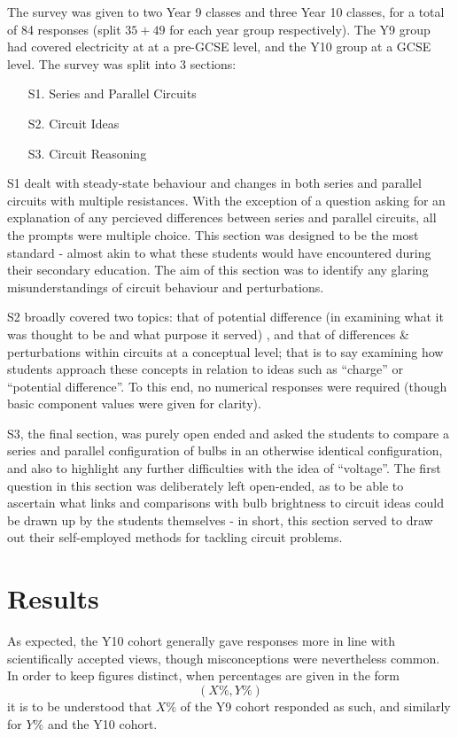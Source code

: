 \documentclass[a4paper,openany,nobib]{tufte-book}
\begin{document}
The survey was given to two Year 9 classes and three Year 10 classes, for a total of 84 responses (split $35+49$ for each year group respectively). The Y9 group had covered electricity at at a pre-GCSE level, and the Y10 group at a GCSE level. The survey was split into 3 sections:
\begin{itemize}
	\item[S1.] Series and Parallel Circuits
	\item[S2.] Circuit Ideas
	\item[S3.] Circuit Reasoning
\end{itemize}
S1 dealt with steady-state behaviour and changes in both series and parallel circuits with multiple resistances. With the exception of a question asking for an explanation of any percieved differences between series and parallel circuits, all the prompts were multiple choice. This section was designed to be the most standard - almost akin to what these students would have encountered during their secondary education. The aim of this section was to identify any glaring misunderstandings of circuit behaviour and perturbations.

S2 broadly covered two topics:
that of potential difference (in examining what it was thought to be and what purpose it served)
, and that of differences \& perturbations within circuits at a conceptual level; that is to say examining how students approach these concepts in relation to ideas such as ``charge'' or ``potential difference''. 
To this end, no numerical responses were required (though basic component values were given for clarity).

S3, the final section, was purely open ended and asked the students to compare a series and parallel configuration of bulbs in an otherwise identical configuration, and also to highlight any further difficulties with the idea of ``voltage''.
The first question in this section was deliberately left open-ended, as to be able to ascertain what links and comparisons with bulb brightness to circuit ideas could be drawn up by the students themselves - in short, this section served to draw out their self-employed methods for tackling circuit problems.
\chapter{Results}
As expected, the Y10 cohort generally gave responses more in line with scientifically accepted views, though misconceptions were nevertheless common. In order to keep figures distinct, when percentages are given in the form 
\begin{equation*}
	(X\%, Y\%)
\end{equation*}
it is to be understood that $X\%$ of the Y9 cohort responded as such, and similarly for $Y\%$ and the Y10 cohort.
\end{document}
